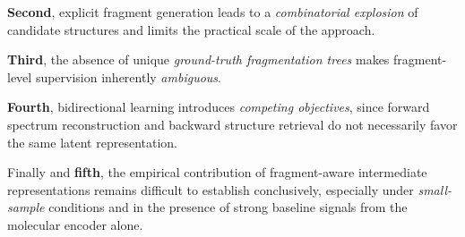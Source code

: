 \textbf{Second}, explicit fragment generation leads to a \emph{combinatorial explosion} of candidate structures and limits the practical scale of the approach. 

\textbf{Third}, the absence of unique \emph{ground-truth fragmentation trees} makes fragment-level supervision inherently \emph{ambiguous}. 

\textbf{Fourth}, bidirectional learning introduces \emph{competing objectives}, since forward spectrum reconstruction and backward structure retrieval do not necessarily favor the same latent representation. 

Finally and \textbf{fifth}, the empirical contribution of fragment-aware intermediate representations remains difficult to establish conclusively, especially under \emph{small-sample} conditions and in the presence of strong baseline signals from the molecular encoder alone.


